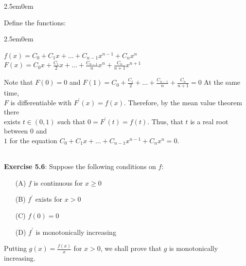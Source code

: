 \documentclass{book}
\newcommand{\pracTwo}{
   \color{Orange}%
   \fontsize{12}{14}\selectfont%
}
\newenvironment{myIndent}{%
   \begin{adjustwidth}{2.5em}{0em}%
}{%
   \end{adjustwidth}%
}
\newcommand{\mySepTwo}[1][.]{%
   {\noindent\color{#1}{\rule{6.5in}{0.5mm}}}\\%
}
\newcommand{\retTwo}{\hfill\bigbreak}
\begin{document}
{\begin{myIndent}\pracTwo
   Define the functions:
   \begin{myIndent}
      $f(x) = C_0 + C_1x + \ldots + C_{n-1}x^{n-1} + C_n x^n$\\
      $F(x) = C_0x + \frac{C_1}{2}x + \ldots + \frac{C_{n-1}}{n}x^n + \frac{C_n}{n+1}x^{n+1}$\retTwo
   \end{myIndent}

   Note that $F(0) = 0$ and $F(1) = C_0 + \frac{C_1}{2} + \ldots + \frac{C_{n-1}}{n} + \frac{C_n}{n+1} = 0$ At the same time,\\ $F$ is differentiable with $F^\prime(x) = f(x)$. Therefore, by the mean value theorem there\\ [1pt] exists $t \in (0, 1)$ such that $0 = F^\prime(t) = f(t)$. Thus, that $t$ is a real root between $0$ and\\ [1pt] $1$ for the equation $C_0 + C_1x + \ldots + C_{n-1}x^{n-1} + C_n x^n= 0$.\retTwo
\end{myIndent}}

\mySepTwo[Black]

\textbf{Exercise 5.6}: Suppose the following conditions on $f$:\\ [-22pt]
\begin{itemize}
   \item[(A)] $f$ is continuous for $x \geq 0$\\[-20pt]
   \item[(B)] $f^\prime$ exists for $x > 0$\\[-20pt]
   \item[(C)] $f(0) = 0$\\[-20pt]
   \item[(D)] $f^\prime$ is monotonically increasing\\[-20pt]  
\end{itemize}
Putting $g(x) = \frac{f(x)}{x}$ for $x > 0$, we shall prove that $g$ is monotonically increasing.
\end{document}
